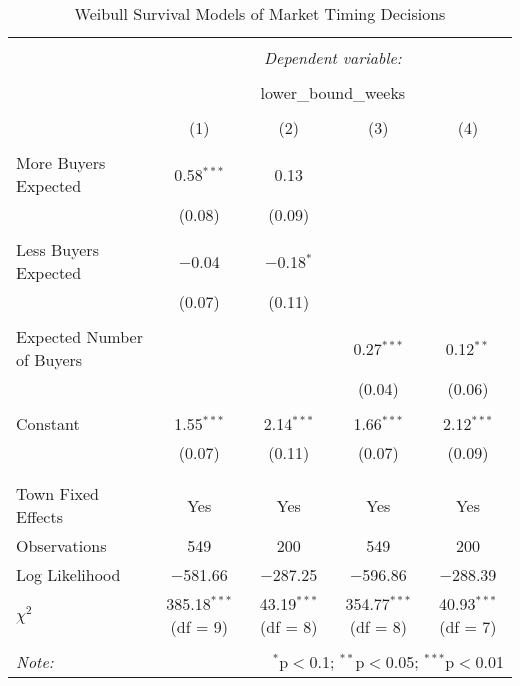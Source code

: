 
\begin{table}[!htbp] \centering 
  \caption{Weibull Survival Models of Market Timing Decisions} 
  \label{} 
\begin{tabular}{@{\extracolsep{5pt}}lcccc} 
\\[-1.8ex]\hline 
\hline \\[-1.8ex] 
 & \multicolumn{4}{c}{\textit{Dependent variable:}} \\ 
\cline{2-5} 
\\[-1.8ex] & \multicolumn{4}{c}{lower\_bound\_weeks} \\ 
\\[-1.8ex] & (1) & (2) & (3) & (4)\\ 
\hline \\[-1.8ex] 
 More Buyers Expected & 0.58$^{***}$ & 0.13 &  &  \\ 
  & (0.08) & (0.09) &  &  \\ 
  & & & & \\ 
 Less Buyers Expected & $-$0.04 & $-$0.18$^{*}$ &  &  \\ 
  & (0.07) & (0.11) &  &  \\ 
  & & & & \\ 
 Expected Number of Buyers &  &  & 0.27$^{***}$ & 0.12$^{**}$ \\ 
  &  &  & (0.04) & (0.06) \\ 
  & & & & \\ 
 Constant & 1.55$^{***}$ & 2.14$^{***}$ & 1.66$^{***}$ & 2.12$^{***}$ \\ 
  & (0.07) & (0.11) & (0.07) & (0.09) \\ 
  & & & & \\ 
\hline \\[-1.8ex] 
Town Fixed Effects & Yes & Yes & Yes & Yes \\ 
Observations & 549 & 200 & 549 & 200 \\ 
Log Likelihood & $-$581.66 & $-$287.25 & $-$596.86 & $-$288.39 \\ 
$\chi^{2}$ & 385.18$^{***}$ (df = 9) & 43.19$^{***}$ (df = 8) & 354.77$^{***}$ (df = 8) & 40.93$^{***}$ (df = 7) \\ 
\hline 
\hline \\[-1.8ex] 
\textit{Note:}  & \multicolumn{4}{r}{$^{*}$p$<$0.1; $^{**}$p$<$0.05; $^{***}$p$<$0.01} \\ 
\end{tabular} 
\end{table} 
